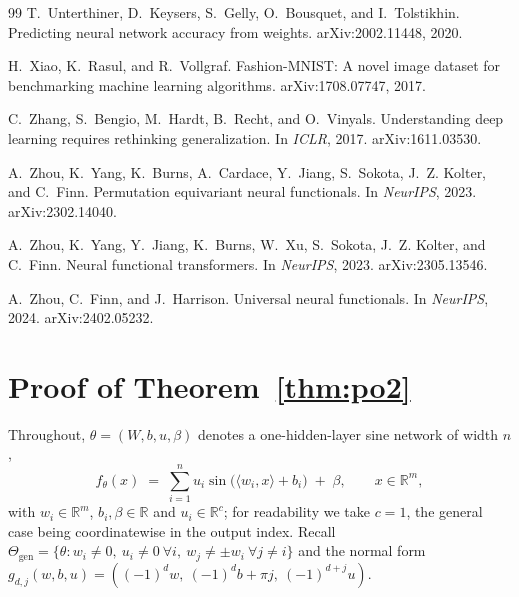 \documentclass[10pt,letterpaper]{article}
\theoremstyle{definition}
\newcommand{\R}{\mathbb{R}}
\newcommand{\Thgen}{\Theta_{\mathrm{gen}}}
\begin{document}
\begin{thebibliography}{99}
T.~Unterthiner, D.~Keysers, S.~Gelly, O.~Bousquet, and I.~Tolstikhin.
\newblock Predicting neural network accuracy from weights.
\newblock arXiv:2002.11448, 2020.

H.~Xiao, K.~Rasul, and R.~Vollgraf.
\newblock Fashion-MNIST: A novel image dataset for benchmarking machine learning algorithms.
\newblock arXiv:1708.07747, 2017.

C.~Zhang, S.~Bengio, M.~Hardt, B.~Recht, and O.~Vinyals.
\newblock Understanding deep learning requires rethinking generalization.
\newblock In \emph{ICLR}, 2017. arXiv:1611.03530.

A.~Zhou, K.~Yang, K.~Burns, A.~Cardace, Y.~Jiang, S.~Sokota, J.~Z. Kolter, and C.~Finn.
\newblock Permutation equivariant neural functionals.
\newblock In \emph{NeurIPS}, 2023. arXiv:2302.14040.

A.~Zhou, K.~Yang, Y.~Jiang, K.~Burns, W.~Xu, S.~Sokota, J.~Z. Kolter, and C.~Finn.
\newblock Neural functional transformers.
\newblock In \emph{NeurIPS}, 2023. arXiv:2305.13546.

A.~Zhou, C.~Finn, and J.~Harrison.
\newblock Universal neural functionals.
\newblock In \emph{NeurIPS}, 2024. arXiv:2402.05232.

\end{thebibliography}

\appendix
\normalsize
\section{Proof of Theorem~\ref{thm:po2}}\label{app:po2}

Throughout, $\theta = (W,b,u,\beta)$ denotes a one-hidden-layer sine network of width $n$,
\begin{equation}
f_\theta(x) \;=\; \sum_{i=1}^{n} u_i \sin\!\big(\langle w_i, x\rangle + b_i\big) \;+\; \beta,
\qquad x \in \R^m,
\label{eq:app-l1}
\end{equation}
with $w_i \in \R^m$, $b_i,\beta \in \R$ and $u_i \in \R^c$; for readability we take $c=1$, the
general case being coordinatewise in the output index. Recall
$\Thgen = \{\theta : w_i \neq 0,\ u_i \neq 0\ \forall i,\ w_j \neq \pm w_i\ \forall j \neq i\}$ and
the normal form $g_{d,j}(w,b,u) = ((-1)^d w,\ (-1)^d b + \pi j,\ (-1)^{d+j}u)$.
\end{document}
